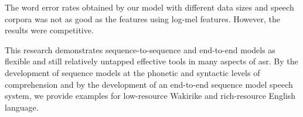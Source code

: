 The word error rates obtained by our model with different data sizes and speech corpora was not as good as the features using log-mel features. However, the results were competitive.

This research demonstrates sequence-to-sequence and end-to-end models as flexible and still relatively untapped effective tools in many aspects of \acrshort{asr}.  By the development of sequence models at the phonetic and syntactic levels of comprehension and by the development of an end-to-end sequence model speech system, we provide examples for low-resource Wakirike and rich-resource English language.
 
\stopblue



